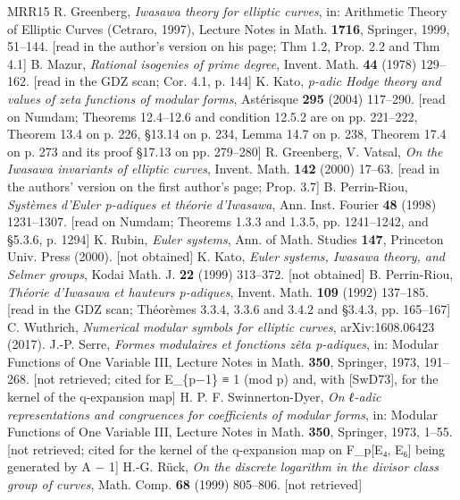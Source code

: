 \documentclass[11pt,a4paper]{article}
\theoremstyle{named}
\begin{document}
\begin{thebibliography}{MRR15}
 R. Greenberg, \textit{Iwasawa theory for elliptic curves}, in: Arithmetic Theory of Elliptic Curves (Cetraro, 1997), Lecture Notes in Math. \textbf{1716}, Springer, 1999, 51–144. [read in the author's version on his page; Thm 1.2, Prop. 2.2 and Thm 4.1]
 B. Mazur, \textit{Rational isogenies of prime degree}, Invent. Math. \textbf{44} (1978) 129–162. [read in the GDZ scan; Cor. 4.1, p. 144]
 K. Kato, \textit{p-adic Hodge theory and values of zeta functions of modular forms}, Astérisque \textbf{295} (2004) 117–290. [read on Numdam; Theorems 12.4–12.6 and condition 12.5.2 are on pp. 221–222, Theorem 13.4 on p. 226, §13.14 on p. 234, Lemma 14.7 on p. 238, Theorem 17.4 on p. 273 and its proof §17.13 on pp. 279–280]
 R. Greenberg, V. Vatsal, \textit{On the Iwasawa invariants of elliptic curves}, Invent. Math. \textbf{142} (2000) 17–63. [read in the authors' version on the first author's page; Prop. 3.7]
 B. Perrin-Riou, \textit{Systèmes d'Euler p-adiques et théorie d'Iwasawa}, Ann. Inst. Fourier \textbf{48} (1998) 1231–1307. [read on Numdam; Theorems 1.3.3 and 1.3.5, pp. 1241–1242, and §5.3.6, p. 1294]
 K. Rubin, \textit{Euler systems}, Ann. of Math. Studies \textbf{147}, Princeton Univ. Press (2000). [not obtained]
 K. Kato, \textit{Euler systems, Iwasawa theory, and Selmer groups}, Kodai Math. J. \textbf{22} (1999) 313–372. [not obtained]
 B. Perrin-Riou, \textit{Théorie d'Iwasawa et hauteurs p-adiques}, Invent. Math. \textbf{109} (1992) 137–185. [read in the GDZ scan; Théorèmes 3.3.4, 3.3.6 and 3.4.2 and §3.4.3, pp. 165–167]
 C. Wuthrich, \textit{Numerical modular symbols for elliptic curves}, arXiv:1608.06423 (2017).
 J.-P. Serre, \textit{Formes modulaires et fonctions zêta p-adiques}, in: Modular Functions of One Variable III, Lecture Notes in Math. \textbf{350}, Springer, 1973, 191–268. [not retrieved; cited for E\_\{p−1\} ≡ 1 (mod p) and, with [SwD73], for the kernel of the q-expansion map]
 H. P. F. Swinnerton-Dyer, \textit{On ℓ-adic representations and congruences for coefficients of modular forms}, in: Modular Functions of One Variable III, Lecture Notes in Math. \textbf{350}, Springer, 1973, 1–55. [not retrieved; cited for the kernel of the q-expansion map on F\_p[E₄, E₆] being generated by A − 1]
 H.-G. Rück, \textit{On the discrete logarithm in the divisor class group of curves}, Math. Comp. \textbf{68} (1999) 805–806. [not retrieved]

\end{thebibliography}
\end{document}

